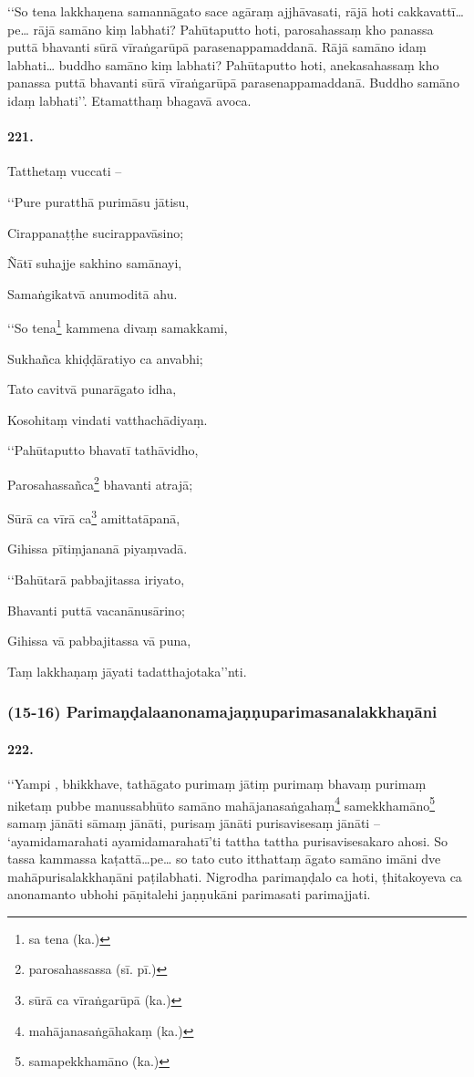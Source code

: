 ‘‘So tena lakkhaṇena samannāgato sace agāraṃ ajjhāvasati, rājā hoti cakkavattī…pe… rājā samāno kiṃ labhati? Pahūtaputto hoti, parosahassaṃ kho panassa puttā bhavanti sūrā vīraṅgarūpā parasenappamaddanā. Rājā samāno idaṃ labhati… buddho samāno kiṃ labhati? Pahūtaputto hoti, anekasahassaṃ kho panassa puttā bhavanti sūrā vīraṅgarūpā parasenappamaddanā. Buddho samāno idaṃ labhati’’. Etamatthaṃ bhagavā avoca.

\paragraph{221.} Tatthetaṃ vuccati –

‘‘Pure puratthā purimāsu jātisu,

Cirappanaṭṭhe sucirappavāsino;

Ñātī suhajje sakhino samānayi,

Samaṅgikatvā anumoditā ahu.

‘‘So tena\footnote{sa tena (ka.)} kammena divaṃ samakkami,

Sukhañca khiḍḍāratiyo ca anvabhi;

Tato cavitvā punarāgato idha,

Kosohitaṃ vindati vatthachādiyaṃ.

‘‘Pahūtaputto bhavatī tathāvidho,

Parosahassañca\footnote{parosahassassa (sī. pī.)} bhavanti atrajā;

Sūrā ca vīrā ca\footnote{sūrā ca vīraṅgarūpā (ka.)} amittatāpanā,

Gihissa pītiṃjananā piyaṃvadā.

‘‘Bahūtarā pabbajitassa iriyato,

Bhavanti puttā vacanānusārino;

Gihissa vā pabbajitassa vā puna,

Taṃ lakkhaṇaṃ jāyati tadatthajotaka’’nti.


\subsubsection{(15-16) Parimaṇḍalaanonamajaṇṇuparimasanalakkhaṇāni}

\paragraph{222.} ‘‘Yampi , bhikkhave, tathāgato purimaṃ jātiṃ purimaṃ bhavaṃ purimaṃ niketaṃ pubbe manussabhūto samāno mahājanasaṅgahaṃ\footnote{mahājanasaṅgāhakaṃ (ka.)} samekkhamāno\footnote{samapekkhamāno (ka.)} samaṃ jānāti sāmaṃ jānāti, purisaṃ jānāti purisavisesaṃ jānāti – ‘ayamidamarahati ayamidamarahatī’ti tattha tattha purisavisesakaro ahosi. So tassa kammassa kaṭattā…pe… so tato cuto itthattaṃ āgato samāno imāni dve mahāpurisalakkhaṇāni paṭilabhati. Nigrodha parimaṇḍalo ca hoti, ṭhitakoyeva ca anonamanto ubhohi pāṇitalehi jaṇṇukāni parimasati parimajjati.

